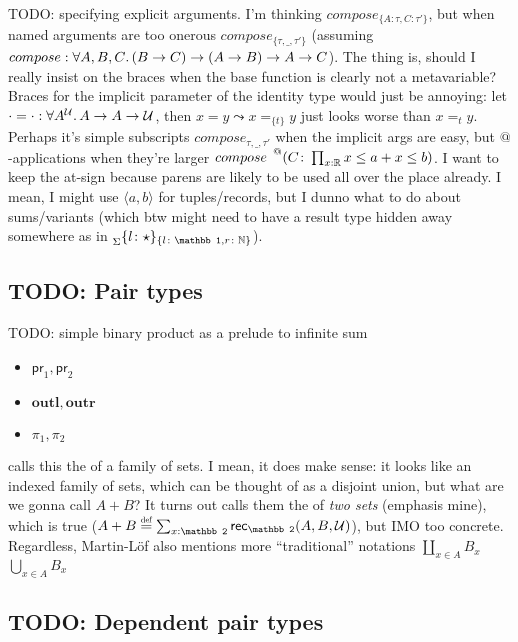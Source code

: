 \documentclass[11pt]{article} %
\theoremstyle{definition}
\theoremstyle{remark}
\begin{document}
TODO: specifying explicit arguments.
I'm thinking $compose_{\{A\colon \tau,C\colon \tau'\}}$, but when named arguments are too onerous $compose_{\{\tau,\_,\tau'\}}$ (assuming $compose : {\forall}{A,B,C}.\, (B \to C) \to (A \to B) \to A \to C$).
The thing is, should I really insist on the braces when the base function is clearly not a metavariable?
Braces for the implicit parameter of the identity type would just be annoying: let $\cdot=\cdot : {\forall}{A^{\mathcal{U}}}.\,A \to A \to \mathcal{U}$, then $x = y \leadsto x =_{\{t\}} y$ just looks worse than $x =_{t} y$.
Perhaps it's simple subscripts $compose_{\tau,\_,\tau'}$ when the implicit args are easy, but $@$-applications when they're larger $compose\;\prescript{@}{}(C\colon \Pitype{x}{\mathbb R} x \leq a + x \leq b)$.
I want to keep the at-sign because parens are likely to be used all over the place already.
I mean, I might use $\langle a, b \rangle$ for tuples/records, but I dunno what to do about sums/variants (which btw might need to have a result type hidden away somewhere as in $\prescript{}{\Sigma}\{l\colon \star\}_{\{l\colon \mathbb 1, r\colon \mathbb N\}}$).


\subsection{TODO: Pair types}
\label{subsec:pair-types}
TODO: simple binary product as a prelude to infinite sum

\begin{itemize}
  \item $\mathsf{pr}_1, \mathsf{pr}_2$
  \item $\mathbf{outl}, \mathbf{outr}$
  \item $\pi_1, \pi_2$
\end{itemize}

\cite{martin-lof_1984} calls this the  of a family of sets.
I mean, it does make sense: it looks like an indexed family of sets, which can be thought of as a disjoint union, but what are we gonna call $A + B$?
It turns out \cite{martin-lof_1984} calls them the  of \emph{two sets} (emphasis mine), which is true ($A + B \defeq \sum_{x:\mathbb 2}\rec_\mathbb 2(A, B, \U)$), but IMO too concrete.
Regardless, Martin-L\"of also mentions more ``traditional'' notations $\coprod_{x \in A}B_x$ $\bigcup_{x \in A}B_x$

\subsection{TODO: Dependent pair types}
\end{document}
